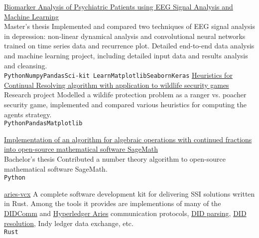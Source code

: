 \documentclass[9pt]{developercv} %
\begin{document}
\begin{entrylist}
	\entry
		{}
		{\href{https://www.scribd.com/document/414005885/Biomarker-Analysis-of-Psychiatric-Patients-using-EEG-Signal-Analysis-and-Machine-Learning}{Biomarker Analysis of Psychiatric Patients using EEG Signal Analysis and Machine Learning}}
		{\\Master's thesis}
		{Implemented and compared two techniques of EEG signal analysis in depression: non-linear dynamical analysis and convolutional neural networks trained on time series data and recurrence plot. Detailed end-to-end data analysis and machine learning project, including detailed input data and results analysis and cleansing. \\
         \texttt{Python}\slashsep\texttt{Numpy}\slashsep\texttt{Pandas}\slashsep\texttt{Sci-kit Learn}\slashsep\texttt{Matplotlib}\slashsep\texttt{Seaborn}\slashsep\texttt{Keras}}
	\entry
		{}
		{\href{https://www.scribd.com/document/372696825/Continual-resolving-heuristics-for-the-PAWS-domain}{Heuristics for Continual Resolving algorithm with application to wildlife security games}}
		{\\Research project}
		{Modelled a wildife protection problem as a ranger vs. poacher security game, implemented and compared various heuristics for computing the agents strategy.\\
         \texttt{Python}\slashsep\texttt{Pandas}\slashsep\texttt{Matplotlib}
        }

	\entry
		{}
		{\href{}{Implementation of an algorithm for algebraic operations with continued fractions into open-source mathematical software SageMath}}
		{\\Bachelor's thesis}
		{Contributed a number theory algorithm to open-source mathematical software SageMath.
         \\\texttt{Python}
        }

	\entry
		{}
		{\href{https://github.com/hyperledger/aries-vcx}{aries-vcx}}
		{}
    {A complete software development kit for delivering SSI solutions written in Rust. Among the tools it provides are implementions of many of the \href{https://didcomm.org/}{DIDComm} and \href{https://github.com/hyperledger/aries}{Hyperledger Aries} communication protocols, \href{https://github.com/hyperledger/aries-vcx/tree/main/did_core/did_parser_nom}{DID parsing}, \href{https://github.com/hyperledger/aries-vcx/tree/main/did_core/did_methods}{DID resolution}, Indy ledger data exchange, etc.\\
         \texttt{Rust}}


\end{entrylist}
\end{document}

